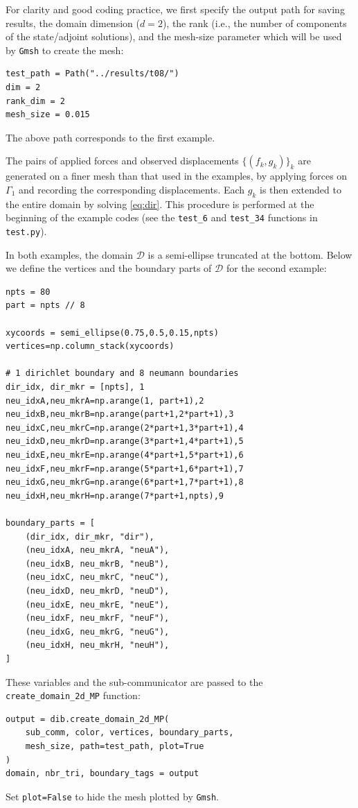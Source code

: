 \documentclass[iicol,pdflatex,sn-mathphys-ay]{sn-jnl}%
\theoremstyle{thmstyleone}%
\theoremstyle{thmstyletwo}%
\theoremstyle{thmstylethree}%
\begin{document}
For clarity and good coding practice, we first specify
the output path for saving results,
the domain dimension ($d=2$),
the rank (i.e., the number of components of the state/adjoint solutions),
and the mesh-size parameter which will be used by
\texttt{Gmsh} to create the mesh:
\begin{lstlisting}
test_path = Path("../results/t08/")
dim = 2
rank_dim = 2
mesh_size = 0.015
\end{lstlisting}
The above path corresponds to the first example.

The pairs of applied forces and observed displacements $\{(f_k,g_k)\}_k$
are generated on a finer mesh than that used in the examples,
by applying forces on $\Gamma_1$ and recording the corresponding displacements.
Each $g_k$ is then extended to the entire domain by solving \eqref{eq:dir}.
This procedure is performed at the beginning of the example codes
(see the \texttt{test\_6} and \texttt{test\_34} functions in \texttt{test.py}).

In both examples, the domain $\mathcal{D}$ is a semi-ellipse truncated at the bottom.
Below we define the vertices and the boundary parts of $\mathcal{D}$ for the second example:

\begin{lstlisting}
npts = 80
part = npts // 8

xycoords = semi_ellipse(0.75,0.5,0.15,npts)
vertices=np.column_stack(xycoords)

# 1 dirichlet boundary and 8 neumann boundaries
dir_idx, dir_mkr = [npts], 1
neu_idxA,neu_mkrA=np.arange(1, part+1),2
neu_idxB,neu_mkrB=np.arange(part+1,2*part+1),3
neu_idxC,neu_mkrC=np.arange(2*part+1,3*part+1),4
neu_idxD,neu_mkrD=np.arange(3*part+1,4*part+1),5
neu_idxE,neu_mkrE=np.arange(4*part+1,5*part+1),6
neu_idxF,neu_mkrF=np.arange(5*part+1,6*part+1),7
neu_idxG,neu_mkrG=np.arange(6*part+1,7*part+1),8
neu_idxH,neu_mkrH=np.arange(7*part+1,npts),9

boundary_parts = [
	(dir_idx, dir_mkr, "dir"),
	(neu_idxA, neu_mkrA, "neuA"),
	(neu_idxB, neu_mkrB, "neuB"),
	(neu_idxC, neu_mkrC, "neuC"),
	(neu_idxD, neu_mkrD, "neuD"),
	(neu_idxE, neu_mkrE, "neuE"),
	(neu_idxF, neu_mkrF, "neuF"),
	(neu_idxG, neu_mkrG, "neuG"),
	(neu_idxH, neu_mkrH, "neuH"),
]
\end{lstlisting}

These variables and the sub-communicator are passed to
the \texttt{create\_domain\_2d\_MP} function:
\begin{lstlisting}
output = dib.create_domain_2d_MP(
	sub_comm, color, vertices, boundary_parts,
	mesh_size, path=test_path, plot=True
)
domain, nbr_tri, boundary_tags = output	
\end{lstlisting}
Set \texttt{plot=False} to hide the mesh plotted by \texttt{Gmsh}.
\end{document}

